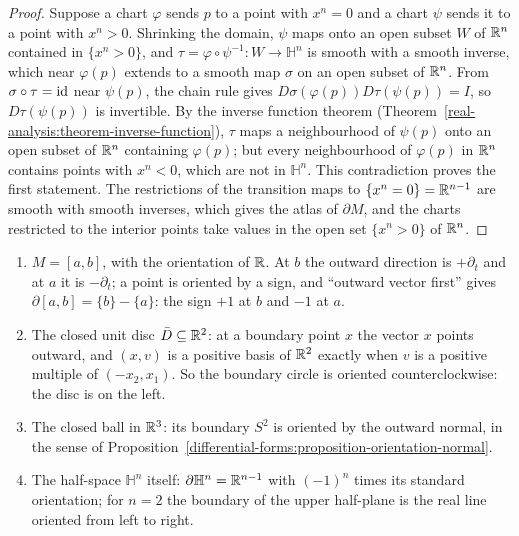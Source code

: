 \begin{proof}
Suppose a chart $\varphi$ sends $p$ to a point with $x^n = 0$ and a chart $\psi$ sends it to a point with $x^n > 0$. Shrinking the domain, $\psi$ maps onto an open subset $W$ of $\mathbb{R}^n$ contained in
$\{x^n > 0\}$, and $\tau = \varphi \circ \psi^{-1} \colon W \to \mathbb{H}^n$ is smooth with a smooth inverse, which near $\varphi(p)$ extends to a smooth map $\sigma$ on an open subset of $\mathbb{R}^n$.
From $\sigma \circ \tau = \mathrm{id}$ near $\psi(p)$, the chain rule gives $D\sigma(\varphi(p))D\tau(\psi(p)) = I$, so $D\tau(\psi(p))$ is invertible. By the inverse function theorem
(Theorem~\ref{real-analysis:theorem-inverse-function}), $\tau$ maps a neighbourhood of $\psi(p)$ onto an open subset of $\mathbb{R}^n$ containing $\varphi(p)$; but every neighbourhood of $\varphi(p)$ in
$\mathbb{R}^n$ contains points with $x^n < 0$, which are not in $\mathbb{H}^n$. This contradiction proves the first statement. The restrictions of the transition maps to $\{x^n = 0\} = \mathbb{R}^{n-1}$ are
smooth with smooth inverses, which gives the atlas of $\partial M$, and the charts restricted to the interior points take values in the open set $\{x^n > 0\}$ of $\mathbb{R}^n$.
\end{proof}

\begin{example}\label{differential-forms:example-boundaries}
\begin{enumerate}
\item $M = [a, b]$, with the orientation of $\mathbb{R}$. At $b$ the outward direction is $+\partial_t$ and at $a$ it is $-\partial_t$; a point is oriented by a sign, and ``outward vector first''
gives $\partial[a, b] = \{b\} - \{a\}$: the sign $+1$ at $b$ and $-1$ at $a$.
\item The closed unit disc $\bar D \subseteq \mathbb{R}^2$: at a boundary point $x$ the vector $x$ points outward, and $(x, v)$ is a positive basis of $\mathbb{R}^2$ exactly when $v$ is a positive multiple of
$(-x_2, x_1)$. So the boundary circle is oriented counterclockwise: the disc is on the left.
\item The closed ball in $\mathbb{R}^3$: its boundary $S^2$ is oriented by the outward normal, in the sense of Proposition~\ref{differential-forms:proposition-orientation-normal}.
\item The half-space $\mathbb{H}^n$ itself: $\partial\mathbb{H}^n = \mathbb{R}^{n-1}$ with $(-1)^n$ times its standard orientation; for $n = 2$ the boundary of the upper half-plane is the
real line oriented from left to right.
\end{enumerate}
\end{example}

